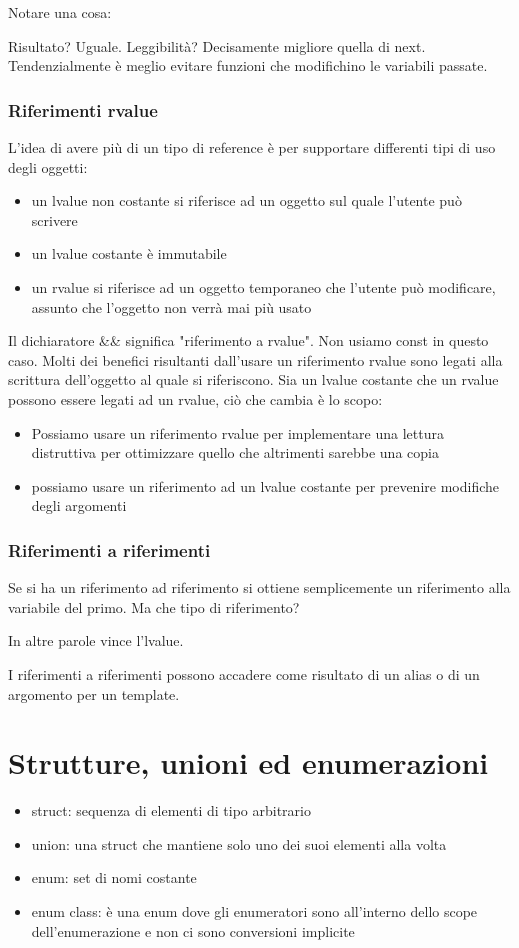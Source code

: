 \documentclass[11pt,a4paper]{book}
\begin{document}
Notare una cosa:
\label{code: 100}

Risultato? Uguale. Leggibilità? Decisamente migliore quella di next. Tendenzialmente è meglio evitare funzioni che modifichino le variabili passate.

\subsection{Riferimenti rvalue}
L'idea di avere più di un tipo di reference è per supportare differenti tipi di uso degli oggetti:
\begin{itemize}
	\item un lvalue non costante si riferisce ad un oggetto sul quale l'utente può scrivere
	\item un lvalue costante è immutabile
	\item un rvalue si riferisce ad un oggetto temporaneo che l'utente può modificare, assunto che l'oggetto non verrà mai più usato
\end{itemize}

Il dichiaratore \&\& significa "riferimento a rvalue". Non usiamo const in questo caso. Molti dei benefici risultanti dall'usare un riferimento rvalue sono legati alla scrittura dell'oggetto al quale si riferiscono. Sia un lvalue costante che un rvalue possono essere legati ad un rvalue, ciò che cambia è lo scopo:
\begin{itemize}
	\item Possiamo usare un riferimento rvalue per implementare una lettura distruttiva per ottimizzare quello che altrimenti sarebbe una copia
	\item possiamo usare un riferimento ad un lvalue costante per prevenire modifiche degli argomenti
\end{itemize}

\subsection{Riferimenti a riferimenti}
Se si ha un riferimento ad riferimento si ottiene semplicemente un riferimento alla variabile del primo. Ma che tipo di riferimento?
\label{code: 102}

In altre parole vince l'lvalue. 

I riferimenti a riferimenti possono accadere come risultato di un alias o di un argomento per un template.

\chapter{Strutture, unioni ed enumerazioni}
\begin{itemize}
	\item struct: sequenza di elementi di tipo arbitrario
	\item union: una struct che mantiene solo uno dei suoi elementi alla volta
	\item enum: set di nomi costante
	\item enum class: è una enum dove gli enumeratori sono all'interno dello scope dell'enumerazione e non ci sono conversioni implicite
\end{itemize}
\end{document}
